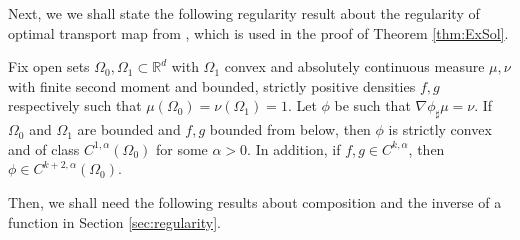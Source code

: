 Next, we we shall state the following regularity result about the regularity of optimal transport map from \cite{OptimalRegularity}, which is used in the proof of Theorem \ref{thm:ExSol}.
\begin{theorem}\label{Thm:OptimalRegularity}
Fix open sets $\Omega_0, \Omega_1\subset\mathbb{R}^d$ with $\Omega_1$ convex and absolutely continuous measure $\mu, \nu$ with finite second moment and bounded, strictly positive densities $f, g$ respectively such that $\mu(\Omega_0) = \nu(\Omega_1) = 1$. Let $\phi$ be such that $\nabla\phi_\sharp\mu = \nu$. If $\Omega_0$ and $\Omega_1$ are bounded and $f, g$ bounded from below, then $\phi$ is strictly convex and of class $C^{1, \alpha}(\Omega_0)$ for some $\alpha > 0$. In addition, if $f, g\in C^{k, \alpha}$, then $\phi\in C^{k+2, \alpha}(\Omega_0)$. 
\end{theorem}

Then, we shall need the following results about composition and the inverse of a function in Section \ref{sec:regularity}.

